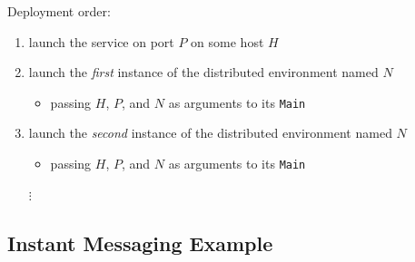 \documentclass[presentation]{beamer}\mode<presentation>{\usetheme{AMSCesenaPurpleAndGold}}
\begin{document}
\begin{frame}[allowframebreaks]
	\framebreak

	Deployment order:
	\medskip
	\begin{enumerate}
		\item launch the \linda{} service on port $P$ on some host $H$
		\medskip
		\item launch the \emph{first} instance of the distributed environment named $N$
		\begin{itemize}
			\item passing $H$, $P$, and $N$ as arguments to its \texttt{Main}
		\end{itemize}
		\medskip
		\item launch the \emph{second} instance of the distributed environment named $N$
		\begin{itemize}
			\item passing $H$, $P$, and $N$ as arguments to its \texttt{Main}
		\end{itemize}
		\medskip
		\item[$\vdots$]
	\end{enumerate}

\end{frame}

\subsection{Instant Messaging Example}

\startDemo
\end{document}
